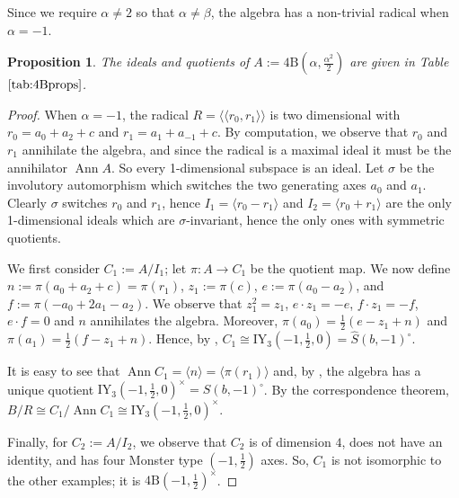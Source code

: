 \documentclass[11pt, a4paper]{article}
\theoremstyle{plain}
\newtheorem{proposition}[theorem]{Proposition}
\theoremstyle{definition}
\newcommand\al{\alpha}
\newcommand\bt{\beta}
\newcommand\la{\langle}
\newcommand\ra{\rangle}
\newcommand\lla{\langle\!\langle}
\newcommand\rra{\rangle\!\rangle}
\DeclareMathOperator{\Ann}{Ann}
\newcommand{\B}{\mathrm{B}}
\newcommand{\IY}{\mathrm{IY}}
\newcommand{\0}{\overline{0}}
\newcommand{\2}{\overline{2}}
\newcommand{\1}{\mathbbm{1}}
\begin{document}
Since we require $\al \neq 2$ so that $\al \neq \bt$, the algebra has a non-trivial radical when $\al = -1$.


\begin{proposition}\label{4Bideals}
	The ideals and quotients of $A := 4\B(\al, \frac{\al^2}{2})$ are given in Table $\ref{tab:4Bprops}$.
\end{proposition}

\begin{proof}
	When $\al = -1$, the radical $R = \lla r_0, r_1 \rra$ is two dimensional with $r_0 = a_0 + a_2 + c$ and $r_1 = a_1 + a_{-1} + c$. By computation, we observe that $r_0$ and $r_1$ annihilate the algebra, and since the radical is a maximal ideal it must be the annihilator $\Ann A$. So every 1-dimensional subspace is an ideal. Let $\sigma$ be the involutory automorphism which switches the two generating axes $a_0$ and $a_1$. Clearly $\sigma$ switches $r_0$ and $r_1$, hence $I_1 = \la r_0 - r_1 \ra$ and $I_2 = \la r_0 + r_1 \ra$ are the only 1-dimensional ideals which are $\sigma$-invariant, hence the only ones with symmetric quotients.

    We first consider $C_1 := A/I_1$; let $\pi \colon A \to C_1$ be the quotient map.  We now define $n:= \pi(a_0+a_2+c)=\pi(r_1)$, $z_1 := \pi(c)$, $e := \pi(a_0-a_2)$, and $f:=\pi(-a_0 +2a_1-a_2)$.  We observe that $z_1^2 = z_1$, $e\cdot z_1 = -e$, $f\cdot z_1 = -f$, $e\cdot f = 0$ and $n$ annihilates the algebra. Moreover, $\pi(a_0) = \tfrac{1}{2}(e-z_1+n)$ and $\pi(a_1) = \tfrac{1}{2}(f-z_1+n)$.   Hence, by \cite[Definition 6.1]{splitspin}, $C_1 \cong \IY_3(-1,\frac{1}{2},0) = \widehat{S}(b, -1)^\circ$.

    It is easy to see that $\Ann C_1 =  \la n \ra = \la \pi(r_1) \ra$ and, by \cite[Theorem 6.8]{splitspin}, the algebra has a unique quotient $\IY_3(-1,\frac{1}{2},0)^\times = S(b, -1)^\circ$. By the correspondence theorem, $B/R \cong C_1/\Ann C_1 \cong \IY_3(-1,\frac{1}{2},0)^\times$.

    Finally, for $C_2 := A/I_2$, we observe that $C_2$ is of dimension $4$, does not have an identity,  and has four Monster type $(-1, \tfrac{1}{2})$ axes. So, $C_1$  is not isomorphic to the other examples; it is $4\B(-1, \frac{1}{2})^\times$.
\end{proof}
\end{document}
